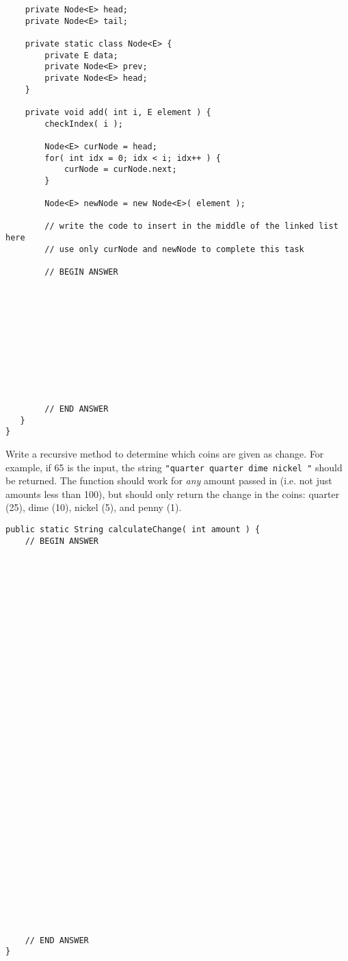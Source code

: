\documentclass[11pt]{exam}
\begin{document}
\begin{questions}
\begin{verbatim}
    private Node<E> head;
    private Node<E> tail;

    private static class Node<E> {
        private E data;
        private Node<E> prev;
        private Node<E> head;
    }

    private void add( int i, E element ) {
        checkIndex( i ); 
	   
        Node<E> curNode = head;
        for( int idx = 0; idx < i; idx++ ) {
            curNode = curNode.next;
        } 
	
        Node<E> newNode = new Node<E>( element );
	
        // write the code to insert in the middle of the linked list here
        // use only curNode and newNode to complete this task
	
        // BEGIN ANSWER











        // END ANSWER
   }
}
\end{verbatim}


\newpage
\question[16] Write a recursive method to determine which coins are given as change.  For example, if 65 is the input, the string {\tt "quarter quarter dime nickel "} should be returned.  The function should work for {\it any} amount passed in (i.e. not just amounts less than 100), but should only return the change in the coins: quarter (25), dime (10), nickel (5), and penny (1).

\begin{verbatim}
public static String calculateChange( int amount ) {
    // BEGIN ANSWER


































    // END ANSWER
}
\end{verbatim}


\end{questions}
\end{document}
